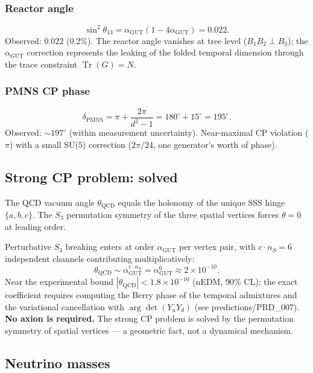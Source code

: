 \documentclass[12pt]{article}
\theoremstyle{remark}
\theoremstyle{definition}
\newcommand{\tr}{\operatorname{Tr}}
\newcommand{\agut}{\alpha_{\mathrm{GUT}}}
\begin{document}
\subsubsection{Reactor angle}
\begin{equation}
\sin^2\theta_{13} = \agut(1 - 4\agut) = 0.022.
\end{equation}
Observed: $0.022$ (0.2\%). The reactor angle vanishes at tree level ($B_1 B_2 \perp B_3$); the $\agut$ correction represents the leaking of the folded temporal dimension through the trace constraint $\tr(G) = N$.

\subsubsection{PMNS CP phase}
\begin{equation}
\delta_\text{PMNS} = \pi + \frac{2\pi}{d^2 - 1} = 180^\circ + 15^\circ = 195^\circ.
\end{equation}
Observed: $\sim 197^\circ$ (within measurement uncertainty). Near-maximal CP violation ($\pi$) with a small SU(5) correction ($2\pi/24$, one generator's worth of phase).

\subsection{Strong CP problem: solved}

The QCD vacuum angle $\theta_\text{QCD}$ equals the holonomy of the unique SSS hinge $\{a, b, c\}$. The $S_3$ permutation symmetry of the three spatial vertices forces $\theta = 0$ at leading order.

Perturbative $S_3$ breaking enters at order $\alpha_\text{GUT}$ per vertex pair, with $c \cdot n_S = 6$ independent channels contributing multiplicatively:
\begin{equation}
\theta_\text{QCD} \sim \alpha_\text{GUT}^{c \cdot n_S} = \alpha_\text{GUT}^6 \approx 2 \times 10^{-10}.
\end{equation}
Near the experimental bound $|\theta_\text{QCD}| < 1.8 \times 10^{-10}$ (nEDM, 90\% CL); the exact coefficient requires computing the Berry phase of the temporal admixtures and the variational cancellation with $\arg\det(Y_u Y_d)$ (see predictions/PRD\_007).  \textbf{No axion is required.} The strong CP problem is solved by the permutation symmetry of spatial vertices --- a geometric fact, not a dynamical mechanism.

\subsection{Neutrino masses}
\end{document}
